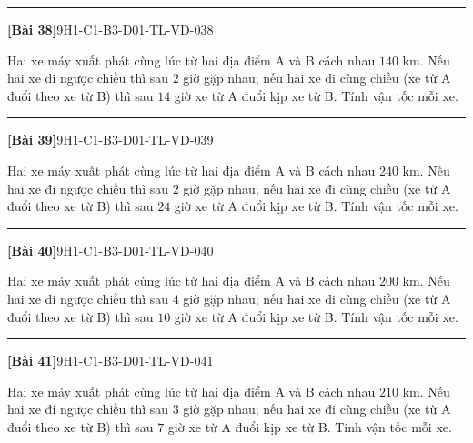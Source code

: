 \documentclass[12pt,a4paper]{article}
\newif\ifloigiai
\newenvironment{cauhoi}[2]{%
  \par\medskip\noindent\rule{\textwidth}{0.4pt}\par\nopagebreak
  \noindent\textbf{[#1]}\hfill{\scriptsize\ttfamily #2}\par\nopagebreak\smallskip}{\par}
\newcommand{\loigiai}[1]{\ifloigiai\par\smallskip\noindent\textit{Lời giải.} #1\par\fi}
\begin{document}
\begin{cauhoi}{Bài 38}{9H1-C1-B3-D01-TL-VD-038}
Hai xe máy xuất phát cùng lúc từ hai địa điểm A và B cách nhau $140$ km. Nếu hai xe đi ngược chiều thì sau $2$ giờ gặp nhau; nếu hai xe đi cùng chiều (xe từ A đuổi theo xe từ B) thì sau $14$ giờ xe từ A đuổi kịp xe từ B. Tính vận tốc mỗi xe.
\loigiai{Gọi vận tốc xe từ A là $x$ (km/h) và xe từ B là $y$ (km/h), $x>y>0$. Đi ngược chiều: $2(x+y)=140$, tức là $x+y=70$. Đi cùng chiều: $14(x-y)=140$, tức là $x-y=10$. Giải hệ ta được $x=40$, $y=30$ (thoả mãn). Vậy vận tốc xe từ A là 40 km/h, xe từ B là 30 km/h.}
\end{cauhoi}
\begin{cauhoi}{Bài 39}{9H1-C1-B3-D01-TL-VD-039}
Hai xe máy xuất phát cùng lúc từ hai địa điểm A và B cách nhau $240$ km. Nếu hai xe đi ngược chiều thì sau $2$ giờ gặp nhau; nếu hai xe đi cùng chiều (xe từ A đuổi theo xe từ B) thì sau $24$ giờ xe từ A đuổi kịp xe từ B. Tính vận tốc mỗi xe.
\loigiai{Gọi vận tốc xe từ A là $x$ (km/h) và xe từ B là $y$ (km/h), $x>y>0$. Đi ngược chiều: $2(x+y)=240$, tức là $x+y=120$. Đi cùng chiều: $24(x-y)=240$, tức là $x-y=10$. Giải hệ ta được $x=65$, $y=55$ (thoả mãn). Vậy vận tốc xe từ A là 65 km/h, xe từ B là 55 km/h.}
\end{cauhoi}
\begin{cauhoi}{Bài 40}{9H1-C1-B3-D01-TL-VD-040}
Hai xe máy xuất phát cùng lúc từ hai địa điểm A và B cách nhau $200$ km. Nếu hai xe đi ngược chiều thì sau $4$ giờ gặp nhau; nếu hai xe đi cùng chiều (xe từ A đuổi theo xe từ B) thì sau $10$ giờ xe từ A đuổi kịp xe từ B. Tính vận tốc mỗi xe.
\loigiai{Gọi vận tốc xe từ A là $x$ (km/h) và xe từ B là $y$ (km/h), $x>y>0$. Đi ngược chiều: $4(x+y)=200$, tức là $x+y=50$. Đi cùng chiều: $10(x-y)=200$, tức là $x-y=20$. Giải hệ ta được $x=35$, $y=15$ (thoả mãn). Vậy vận tốc xe từ A là 35 km/h, xe từ B là 15 km/h.}
\end{cauhoi}
\begin{cauhoi}{Bài 41}{9H1-C1-B3-D01-TL-VD-041}
Hai xe máy xuất phát cùng lúc từ hai địa điểm A và B cách nhau $210$ km. Nếu hai xe đi ngược chiều thì sau $3$ giờ gặp nhau; nếu hai xe đi cùng chiều (xe từ A đuổi theo xe từ B) thì sau $7$ giờ xe từ A đuổi kịp xe từ B. Tính vận tốc mỗi xe.
\loigiai{Gọi vận tốc xe từ A là $x$ (km/h) và xe từ B là $y$ (km/h), $x>y>0$. Đi ngược chiều: $3(x+y)=210$, tức là $x+y=70$. Đi cùng chiều: $7(x-y)=210$, tức là $x-y=30$. Giải hệ ta được $x=50$, $y=20$ (thoả mãn). Vậy vận tốc xe từ A là 50 km/h, xe từ B là 20 km/h.}
\end{cauhoi}
\end{document}
